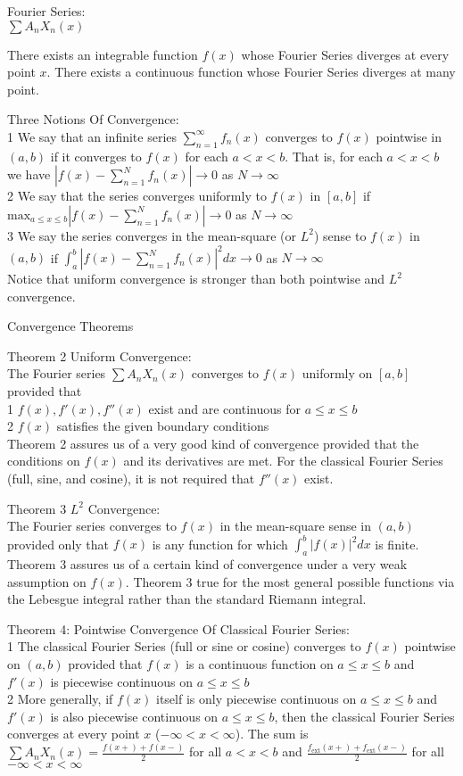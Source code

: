 Fourier Series: \\
$\sum A_n X_n (x)$

There exists an integrable function $f(x)$ whose Fourier Series diverges at every point $x$. There exists a continuous function whose Fourier Series diverges at many point.

Three Notions Of Convergence: \\
1 We say that an infinite series $\sum_{n=1}^{\infty} f_n (x)$ converges to $f(x)$ pointwise in $(a,b)$ if it converges to $f(x)$ for each $a<x<b$. That is, for each $a<x<b$ we have $|f(x)-\sum_{n=1}^{N} f_n(x)| \to 0$ as $N \to \infty$ \\
2 We say that the series converges uniformly to $f(x)$ in $[a,b]$ if $\text{max}_{a \le x \le b} |f(x)-\sum_{n=1}^N f_n (x)| \to 0$ as $N \to \infty$ \\
3 We say the series converges in the mean-square (or $L^2$) sense to $f(x)$ in $(a,b)$ if $\int_a^b |f(x)-\sum_{n=1}^N f_n (x)|^2 dx \to 0$ as $N \to \infty$ \\
Notice that uniform convergence is stronger than both pointwise and $L^2$ convergence.

Convergence Theorems

Theorem 2 Uniform Convergence: \\
The Fourier series $\sum A_n X_n (x)$ converges to $f(x)$ uniformly on $[a,b]$ provided that \\
1 $f(x),f'(x),f''(x)$ exist and are continuous for $a \le x \le b$ \\
2 $f(x)$ satisfies the given boundary conditions \\
Theorem 2 assures us of a very good kind of convergence provided that the conditions on $f(x)$ and its derivatives are met. For the classical Fourier Series (full, sine, and cosine), it is not required that $f''(x)$ exist.

Theorem 3 $L^2$ Convergence: \\
The Fourier series converges to $f(x)$ in the mean-square sense in $(a,b)$ provided only that $f(x)$ is any function for which $\int_a^b |f(x)|^2 dx$ is finite. Theorem 3 assures us of a certain kind of convergence under a very weak assumption on $f(x)$. Theorem 3 true for the most general possible functions via the Lebesgue integral rather than the standard Riemann integral.

Theorem 4: Pointwise Convergence Of Classical Fourier Series: \\
1 The classical Fourier Series (full or sine or cosine) converges to $f(x)$ pointwise on $(a,b)$ provided that $f(x)$ is a continuous function on $a \le x \le b$ and $f'(x)$ is piecewise continuous on $a \le x \le b$ \\
2 More generally, if $f(x)$ itself is only piecewise continuous on $a \le x \le b$ and $f'(x)$ is also piecewise continuous on $a \le x \le b$, then the classical Fourier Series converges at every point $x$ ($-\infty < x < \infty$). The sum is $\sum A_n X_n (x) = \frac{f(x+)+f(x-)}{2}$ for all $a<x<b$ and $\frac{f_{\text{ext}} (x+)+f_{\text{ext}} (x-)}{2}$ for all $-\infty < x < \infty$

